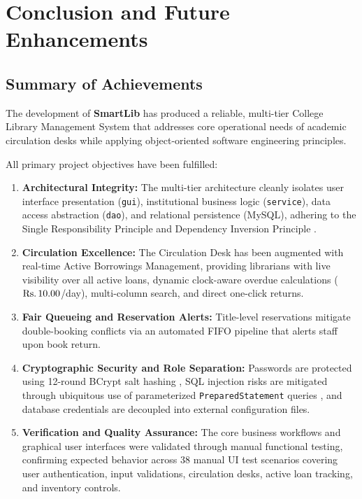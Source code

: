 \chapter{Conclusion and Future Enhancements}

\section{Summary of Achievements}
The development of \textbf{SmartLib} has produced a reliable, multi-tier College Library Management System that addresses core operational needs of academic circulation desks while applying object-oriented software engineering principles.

All primary project objectives have been fulfilled:
\begin{enumerate}
    \item \textbf{Architectural Integrity:} The multi-tier architecture cleanly isolates user interface presentation (\texttt{gui}), institutional business logic (\texttt{service}), data access abstraction (\texttt{dao}), and relational persistence (MySQL), adhering to the Single Responsibility Principle and Dependency Inversion Principle \cite{bloch2018effective,gamma1994design}.
    \item \textbf{Circulation Excellence:} The Circulation Desk has been augmented with real-time Active Borrowings Management, providing librarians with live visibility over all active loans, dynamic clock-aware overdue calculations ($\text{\text{Rs.\,}} 10.00$/day), multi-column search, and direct one-click returns.
    \item \textbf{Fair Queueing and Reservation Alerts:} Title-level reservations mitigate double-booking conflicts via an automated FIFO pipeline that alerts staff upon book return.
    \item \textbf{Cryptographic Security and Role Separation:} Passwords are protected using 12-round BCrypt salt hashing \cite{miller2020jbcrypt}, SQL injection risks are mitigated through ubiquitous use of parameterized \texttt{PreparedStatement} queries \cite{oracle2021jdbc}, and database credentials are decoupled into external configuration files.
    \item \textbf{Verification and Quality Assurance:} The core business workflows and graphical user interfaces were validated through manual functional testing, confirming expected behavior across 38 manual UI test scenarios covering user authentication, input validations, circulation desks, active loan tracking, and inventory controls.
\end{enumerate}

